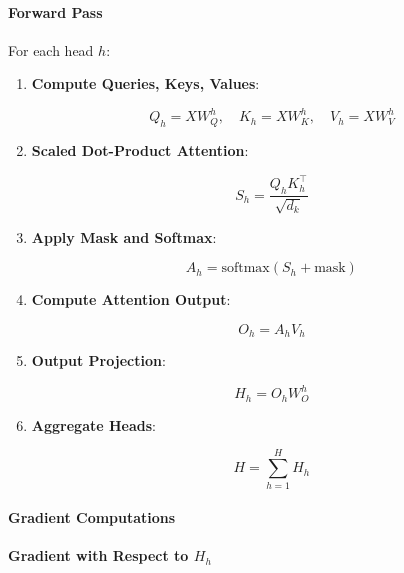 \documentclass{article}
\begin{document}
\paragraph{Forward Pass}

For each head $h$:

\begin{enumerate}
    \item \textbf{Compute Queries, Keys, Values}:

    \begin{equation}
        Q_h = X W_Q^h, \quad K_h = X W_K^h, \quad V_h = X W_V^h
    \end{equation}

    \item \textbf{Scaled Dot-Product Attention}:

    \begin{equation}
        S_h = \frac{Q_h K_h^\top}{\sqrt{d_k}}
    \end{equation}

    \item \textbf{Apply Mask and Softmax}:

    \begin{equation}
        A_h = \text{softmax}(S_h + \text{mask})
    \end{equation}

    \item \textbf{Compute Attention Output}:

    \begin{equation}
        O_h = A_h V_h
    \end{equation}

    \item \textbf{Output Projection}:

    \begin{equation}
        H_h = O_h W_O^h
    \end{equation}

    \item \textbf{Aggregate Heads}:

    \begin{equation}
        H = \sum_{h=1}^{H} H_h
    \end{equation}
\end{enumerate}

\paragraph{Gradient Computations}

\textbf{Gradient with Respect to $H_h$}
\end{document}
